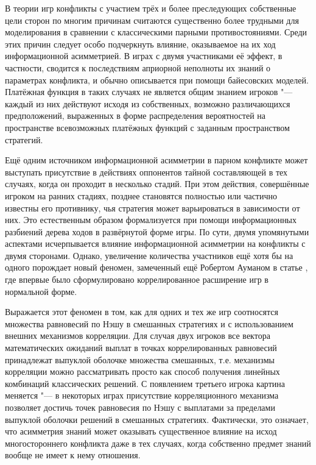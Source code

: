 
{\actuality} В теории игр конфликты с участием трёх и более преследующих собственные цели сторон по многим причинам считаются существенно более трудными для моделирования в сравнении с классическими парными противостояниями. Среди этих причин следует особо подчеркнуть влияние, оказываемое на их ход информационной асимметрией. В играх с двумя участниками её эффект, в частности, сводится к последствиям априорной неполноты их знаний о параметрах конфликта, и обычно описывается при помощи байесовских моделей. Платёжная функция в таких случаях не является общим знанием игроков "--- каждый из них действуют исходя из собственных, возможно различающихся предположений, выраженных в форме распределения вероятностей на пространстве всевозможных платёжных функций с заданным пространством стратегий.

Ещё одним источником информационной асимметрии в парном конфликте может выступать присутствие в действиях оппонентов тайной составляющей в тех случаях, когда он проходит в несколько стадий. При этом действия, совершённые игроком на ранних стадиях, позднее становятся полностью или частично известны его противнику, чья стратегия может варьироваться в зависимости от них. Это естественным образом формализуется при помощи информационных разбиений дерева ходов в развёрнутой форме игры. По сути, двумя упомянутыми аспектами исчерпывается влияние информационной асимметрии на конфликты с двумя сторонами. Однако, увеличение количества участников ещё хотя бы на одного порождает новый феномен, замеченный ещё Робертом Ауманом в статье \fixme{[1]}, где впервые было сформулировано коррелированное расширение игр в нормальной форме.

Выражается этот феномен в том, как для одних и тех же игр соотносятся множества равновесий по Нэшу в смешанных стратегиях и с использованием внешних механизмов корреляции. Для случая двух игроков все вектора математических ожиданий выплат в точках коррелированных равновесий принадлежат выпуклой оболочке множества смешанных, т.\:е. механизмы корреляции можно рассматривать просто как способ получения линейных комбинаций классических решений. С появлением третьего игрока картина меняется "--- в некоторых играх присутствие корреляционного механизма позволяет достичь точек равновесия по Нэшу с выплатами за пределами выпуклой оболочки решений в смешанных стратегиях. Фактически, это означает, что асимметрия знаний может оказывать существенное влияние на исход многостороннего конфликта даже в тех случаях, когда собственно предмет знаний вообще не имеет к нему отношения.

